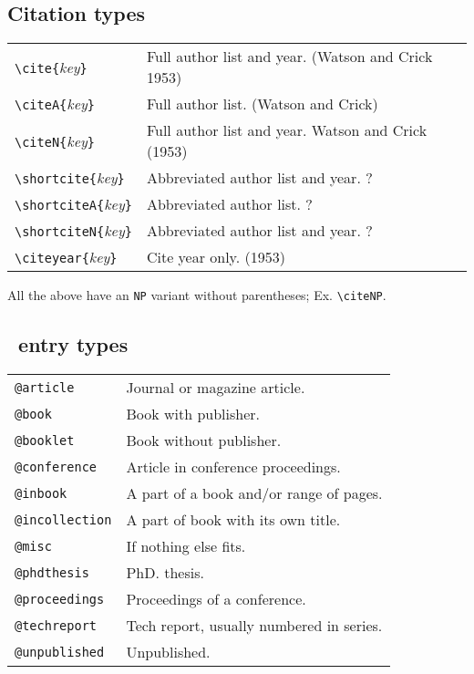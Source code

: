 \subsection{Citation types}
\begin{tabular}{@{}p{\the\MyLen}@{}p{\linewidth-\the\MyLen}@{}}
\verb!\cite{!\textit{key}\verb!}!       &
        Full author list and year. (Watson and Crick 1953) \\
\verb!\citeA{!\textit{key}\verb!}!      &
        Full author list. (Watson and Crick) \\
\verb!\citeN{!\textit{key}\verb!}!      &
        Full author list and year. Watson and Crick (1953) \\
\verb!\shortcite{!\textit{key}\verb!}!  &
        Abbreviated author list and year. ? \\
\verb!\shortciteA{!\textit{key}\verb!}! &
        Abbreviated author list. ? \\
\verb!\shortciteN{!\textit{key}\verb!}! &
        Abbreviated author list and year. ? \\
\verb!\citeyear{!\textit{key}\verb!}!   &
        Cite year only. (1953) \\
\end{tabular}

All the above have an \texttt{NP} variant without parentheses;
Ex. \verb!\citeNP!.


\subsection{\BibTeX\ entry types}
\begin{tabular}{@{}p{\the\MyLen}@{}p{\linewidth-\the\MyLen}@{}}
\verb!@article!         &  Journal or magazine article. \\
\verb!@book!            &  Book with publisher. \\
\verb!@booklet!         &  Book without publisher. \\
\verb!@conference!      &  Article in conference proceedings. \\
\verb!@inbook!          &  A part of a book and/or range of pages. \\
\verb!@incollection!    &  A part of book with its own title. \\
\verb!@misc!            &  If nothing else fits. \\
\verb!@phdthesis!       &  PhD. thesis. \\
\verb!@proceedings!     &  Proceedings of a conference. \\
\verb!@techreport!      &  Tech report, usually numbered in series. \\
\verb!@unpublished!     &  Unpublished. \\
\end{tabular}

